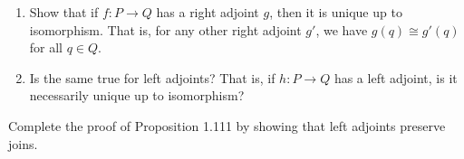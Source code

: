 \begin{enumerate}
	\item Show that if $f:P\to Q$ has a right adjoint $g$, then it is unique up to isomorphism.  That is, for any other right adjoint $g'$, we have $g(q)\cong g'(q)$ for all $q\in Q$.
	\item Is the same true for left adjoints?  That is, if $h:P\to Q$ has a left adjoint, is it necessarily unique up to isomorphism?
\end{enumerate}

\solution

Complete the proof of Proposition 1.111 by showing that left adjoints preserve joins.

\solution



